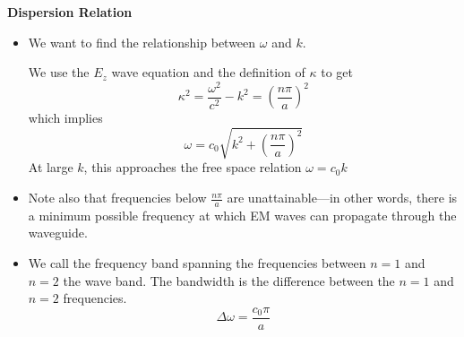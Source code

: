 \documentclass[11pt, a4paper]{article}
\begin{document}
\textbf{Dispersion Relation}
\begin{itemize}
	\item We want to find the relationship between $ \omega $ and $ k $.
	
	We use the $ E_{z} $ wave equation and the definition of $ \kappa $ to get
	\begin{equation*}
		\kappa^{2} = \frac{\omega^{2}}{c^{2}} - k^{2} = \left(\frac{n\pi}{a}\right)^{2}
	\end{equation*}
	which implies
	\begin{equation*}
		\omega = c_{0}\sqrt{k^{2} + \left(\frac{n\pi}{a}\right)^{2}}
	\end{equation*}
	At large $ k $, this approaches the free space relation $ \omega = c_{0}k $
	
	\item Note also that frequencies below $ \frac{n\pi}{a} $ are unattainable---in other words, there is a minimum possible frequency at which EM waves can propagate through the waveguide.
	
	\item We call the frequency band spanning the frequencies between $ n = 1 $ and $ n = 2 $ the wave band. The bandwidth is the difference between the $ n = 1 $ and $ n = 2 $ frequencies.
	\begin{equation*}
		\Delta \omega = \frac{c_{0}\pi}{a}
	\end{equation*}
\end{itemize}
\end{document}
